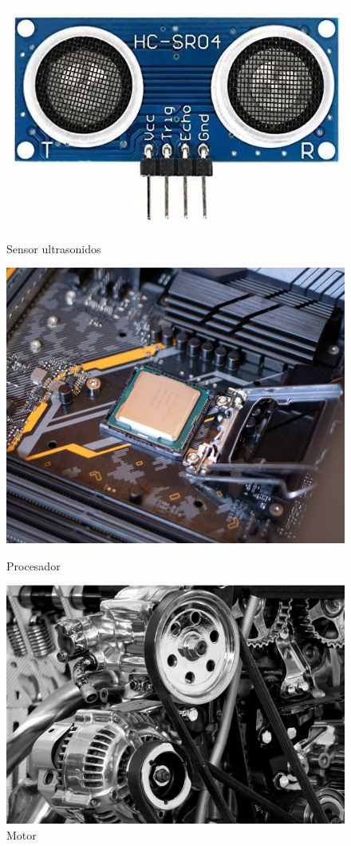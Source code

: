 \begin{figure}[H] 
  \label{ fig7} 
  \begin{minipage}[b]{0.5\linewidth}
    \centering
    \includegraphics[width=.65\linewidth]{chapters/images/us.jpg} 
    \caption{Sensor ultrasonidos} 
  \end{minipage}%
  \begin{minipage}[b]{0.5\linewidth}
    \centering
    \includegraphics[width=.65\linewidth]{chapters/images/procesador.png} 
    \caption{Procesador} 
  \end{minipage} 
  \begin{minipage}[b]{0.5\linewidth}
    \centering
    \includegraphics[width=.65\linewidth]{chapters/images/motor.png} 
    \caption{Motor} 

\end{minipage}
\end{figure}

